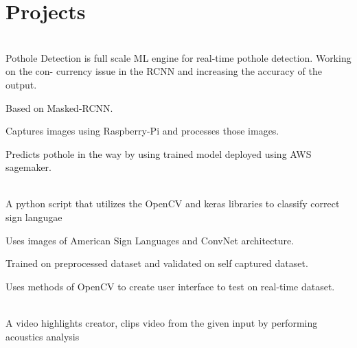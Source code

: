 \documentclass[]{deedy-resume-openfont}
\begin{document}
\begin{minipage}[t]{0.66\textwidth}
\section{Projects}

\\
Pothole Detection is full scale ML engine for real-time pothole detection.
Working on the con- currency issue in the RCNN and increasing the accuracy
of the output.\\

\begin{tightemize}
\item Based on Masked-RCNN. \\
\item Captures images using Raspberry-Pi and processes those images. \\
\item Predicts pothole in the way by using trained model deployed using AWS sagemaker. \\

\end{tightemize}
\sectionsep

\\
A python script that utilizes the OpenCV and keras libraries to classify correct sign langugae\\

\begin{tightemize}
\item Uses images of American Sign Languages and ConvNet architecture. \\
\item Trained on preprocessed dataset and validated on self captured dataset. \\
\item Uses methods of OpenCV to create user interface to test on real-time dataset. \\
\end{tightemize}
\sectionsep

\\
A video highlights creator, clips video from the given input by performing acoustics analysis\\


\end{minipage}
\end{document}
